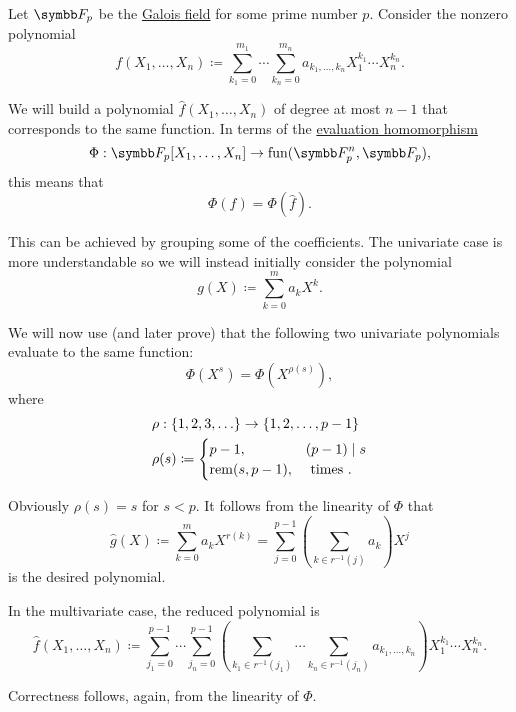 \begin{algorithm}\label{alg:finite_field_polynomial_reduction}
  Let \( \BF_p \) be the \hyperref[thm:galois_field_existence]{Galois field} for some prime number \( p \). Consider the nonzero polynomial
  \begin{equation*}
    f(X_1, \ldots, X_n) \coloneqq \sum_{k_1=0}^{m_1} \cdots \sum_{k_n=0}^{m_n} a_{k_1,\ldots,k_n} X_1^{k_1} \cdots X_n^{k_n}.
  \end{equation*}

  We will build a polynomial \( \hat f(X_1, \ldots, X_n) \) of degree at most \( n - 1 \) that corresponds to the same function. In terms of the \hyperref[thm:polynomial_ring_universal_property]{evaluation homomorphism}
  \begin{equation*}
    \Phi: \BF_p[X_1, \ldots, X_n] \to \Fun(\BF_p^n, \BF_p),
  \end{equation*}
  this means that
  \begin{equation*}
    \Phi(f) = \Phi(\hat f).
  \end{equation*}

  This can be achieved by grouping some of the coefficients. The univariate case is more understandable so we will instead initially consider the polynomial
  \begin{equation*}
    g(X) \coloneqq \sum_{k=0}^m a_k X^k.
  \end{equation*}

  We will now use (and later prove) that the following two univariate polynomials evaluate to the same function:
  \begin{equation}\label{eq:alg:finite_field_polynomial_reduction/reduction}
    \Phi(X^s) = \Phi(X^{\rho(s)}),
  \end{equation}
  where
  \begin{align*}
    &\rho: \{ 1, 2, 3, \ldots \} \to \{ 1, 2, \ldots, p - 1 \} \\
    &\rho(s) \coloneqq \begin{cases}
      p - 1,          &(p - 1) \mid s \\
      \operatorname{rem}(s, p - 1), &\text{ times }.
    \end{cases}
  \end{align*}

  Obviously \( \rho(s) = s \) for \( s < p \). It follows from the linearity of \( \Phi \) that
  \begin{equation*}
    \hat g(X)
    \coloneqq
    \sum_{k=0}^m a_k X^{r(k)}
    =
    \sum_{j=0}^{p-1} \left( \sum_{k \in r^{-1}(j)} a_k \right) X^j
  \end{equation*}
  is the desired polynomial.

  In the multivariate case, the reduced polynomial is
  \begin{equation*}
    \hat f(X_1, \ldots, X_n) \coloneqq \sum_{j_1=0}^{p-1} \cdots \sum_{j_n=0}^{p-1} \left( \sum_{k_1 \in r^{-1}(j_1)} \cdots \sum_{k_n \in r^{-1}(j_n)} a_{k_1,\ldots,k_n} \right) X_1^{k_1} \cdots X_n^{k_n}.
  \end{equation*}

  Correctness follows, again, from the linearity of \( \Phi \).
\end{algorithm}
